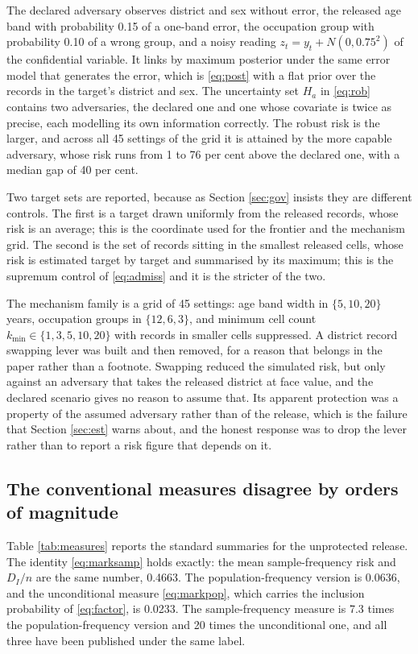 \documentclass[11pt,a4paper]{article}
\theoremstyle{plain}
\theoremstyle{definition}
\begin{document}
The declared adversary observes district and sex without error, the released
age band with probability 0.15 of a one-band error, the occupation group with
probability 0.10 of a wrong group, and a noisy reading $z_t = y_t + N(0,
0.75^2)$ of the confidential variable. It links by maximum posterior under the
same error model that generates the error, which is \eqref{eq:post} with a flat
prior over the records in the target's district and sex. The uncertainty set
$H_a$ in \eqref{eq:rob} contains two adversaries, the declared one and one
whose covariate is twice as precise, each modelling its own information
correctly. The robust risk is the larger, and across all 45 settings of the
grid it is attained by the more capable adversary, whose risk runs from 1 to 76
per cent above the declared one, with a median gap of 40 per cent.

Two target sets are reported, because as Section \ref{sec:gov} insists they are
different controls. The first is a target drawn uniformly from the released
records, whose risk is an average; this is the coordinate used for the frontier
and the mechanism grid. The second is the set of records sitting in the smallest
released cells, whose risk is estimated target by target and summarised by its
maximum; this is the supremum control of \eqref{eq:admiss} and it is the
stricter of the two.

The mechanism family is a grid of 45 settings: age band width in
$\{5, 10, 20\}$ years, occupation groups in $\{12, 6, 3\}$, and minimum cell
count $k_{\min} \in \{1, 3, 5, 10, 20\}$ with records in smaller cells
suppressed. A district record swapping lever \citep{fienbergmcintyre2004} was
built and then removed, for a
reason that belongs in the paper rather than a footnote. Swapping reduced the simulated risk, but only against an
adversary that takes the released district at face value, and the declared
scenario gives no reason to assume that. Its apparent protection was a property
of the assumed adversary rather than of the release, which is the failure that
Section \ref{sec:est} warns about, and the honest response was to drop the lever
rather than to report a risk figure that depends on it.

\subsection{The conventional measures disagree by orders of magnitude}

Table \ref{tab:measures} reports the standard summaries for the unprotected
release. The identity \eqref{eq:marksamp} holds exactly: the mean
sample-frequency risk and $D_I/n$ are the same number, 0.4663. The
population-frequency version is 0.0636, and the unconditional measure
\eqref{eq:markpop}, which carries the inclusion probability of
\eqref{eq:factor}, is 0.0233. The sample-frequency measure is 7.3 times the
population-frequency version and 20 times the unconditional one, and all three
have been published under the same label.
\end{document}
